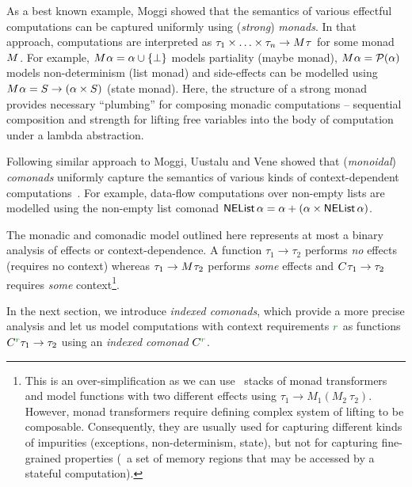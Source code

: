 As a best known example, Moggi \cite{monad-notions} showed that the semantics of various effectful 
computations can be captured uniformly using (\emph{strong}) \emph{monads}. In that 
approach, computations are interpreted as $\tau_1 \times \ldots \times \tau_n \rightarrow M^{}\tau$
for some monad $M^{}$. For example, $M^{}\alpha = \alpha \cup \{ \bot \}$ models 
partiality (maybe monad), $M^{}\alpha = \mathcal{P}(\alpha)$ models non-determinism (list 
monad) and side-effects can be modelled using $M^{}\alpha = S \rightarrow (\alpha \times S)$ 
(state monad). Here, the structure of a strong monad provides necessary ``plumbing'' for composing 
monadic computations -- sequential composition and strength for lifting free variables into the
body of computation under a lambda abstraction.

Following similar approach to Moggi, Uustalu and Vene \cite{comonads-notions} showed that 
(\emph{monoidal}) \emph{comonads} uniformly capture the semantics of various kinds of context-dependent 
computations~\cite{comonads-notions}. For example, data-flow computations over non-empty lists
are modelled using the non-empty list comonad $\ident{NEList}\,\alpha = \alpha + (\alpha \times \ident{NEList}\,\alpha)$.

The monadic and comonadic model outlined here represents at most a binary analysis of effects or 
context-dependence. A function $\tau_1 \rightarrow \tau_2$ performs \emph{no} effects (requires no 
context) whereas $\tau_1 \rightarrow M^{}\tau_2$ performs \emph{some} effects and
$C^{}\tau_1 \rightarrow \tau_2$ requires \emph{some} context\footnote{This is an 
over-simplification as we can use \eg~stacks of monad transformers and model functions with
two different effects using $\tau_1 \rightarrow M_1(M_2~\tau_2)$. However, monad transformers 
require defining complex system of lifting to be composable. Consequently, they are usually used
for capturing different kinds of impurities (exceptions, non-determinism, state), but not for
capturing fine-grained properties (\eg~a set of memory regions that may be accessed by a
stateful computation).}. 

In the next section, we introduce \emph{indexed comonads}, which provide a more precise analysis 
and let us model computations with context requirements $\cclrd{r}$ as functions 
$\ctyp{\cclrd{r}}{\tau_1} \rightarrow \tau_2$ using an \emph{indexed comonad} $\ctyp{\cclrd{r}}{}$.


